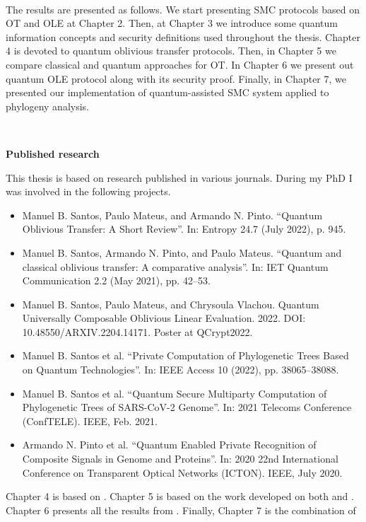 \

The results are presented as follows. We start presenting SMC protocols based on OT and OLE at Chapter 2. Then, at Chapter 3 we introduce some quantum information concepts and security definitions used throughout the thesis. Chapter 4 is devoted to quantum oblivious transfer protocols. Then, in Chapter 5 we compare classical and quantum approaches for OT. In Chapter 6 we present out quantum OLE protocol along with its security proof. Finally, in Chapter 7, we presented our implementation of quantum-assisted SMC system applied to phylogeny analysis.


\

\noindent\textbf{Published research}

This thesis is based on research published in various journals. During my PhD I was involved in the following projects.

\begin{itemize}
	\item\cite{SPM21} Manuel B. Santos, Paulo Mateus, and Armando N. Pinto. “Quantum Oblivious Transfer:
A Short Review”. In: Entropy 24.7 (July 2022), p. 945.

	\item\cite{SPM21} Manuel B. Santos, Armando N. Pinto, and Paulo Mateus. “Quantum and classical
oblivious transfer: A comparative analysis”. In: IET Quantum Communication 2.2 (May 2021), pp. 42–53.

	\item\cite{SMV22} Manuel B. Santos, Paulo Mateus, and Chrysoula Vlachou. Quantum Universally
Composable Oblivious Linear Evaluation. 2022. DOI: 10.48550/ARXIV.2204.14171. Poster at QCrypt2022.

	\item\cite{SGPM22} Manuel B. Santos et al. “Private Computation of Phylogenetic Trees Based on Quantum
Technologies”. In: IEEE Access 10 (2022), pp. 38065–38088.

	\item\cite{SGPM21} Manuel B. Santos et al. “Quantum Secure Multiparty Computation of Phylogenetic Trees of SARS-CoV-2 Genome”. In: 2021 Telecoms Conference (ConfTELE). IEEE, Feb. 2021.

\item\cite{POS+20} Armando N. Pinto et al. “Quantum Enabled Private Recognition of Composite Signals
in Genome and Proteins”. In: 2020 22nd International Conference on Transparent Optical
Networks (ICTON). IEEE, July 2020. 
\end{itemize}


Chapter 4 is based on \cite{SPM21}. Chapter 5 is based on the work developed on both \cite{SPM21} and \cite{SGPM22}. Chapter 6 presents all the results from \cite{SMV22}. Finally, Chapter 7 is the combination of \cite{SGPM22, SGPM21, POS+20}

%
%
%
